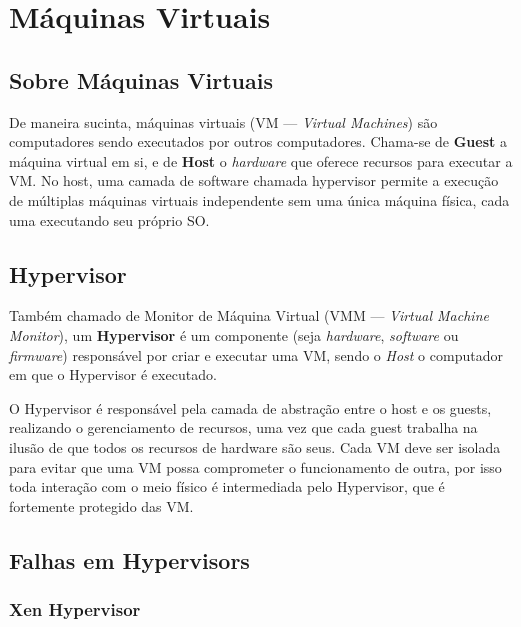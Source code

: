\documentclass{report}
\title{\todo{A gente descobre depois}}
\author{João Gabriel Trombeta\\
        João Paulo Taylor Ienczak Zanette\\
        Ranieri Schroeder Althoff}
\date{\today}
\begin{document}
\maketitle

\tableofcontents

\chapter{Máquinas Virtuais}

\section{Sobre Máquinas Virtuais}

De maneira sucinta, máquinas virtuais (VM --- \textit{Virtual Machines}) são
computadores sendo executados por outros computadores. Chama-se de
\textbf{Guest} a máquina virtual em si, e de \textbf{Host} o \textit{hardware}
que oferece recursos para executar a VM\@. No host, uma camada de software
chamada hypervisor permite a execução de múltiplas máquinas virtuais
independente sem uma única máquina física, cada uma executando seu próprio
SO\@.

\section{Hypervisor}

Também chamado de Monitor de Máquina Virtual (VMM --- \textit{Virtual Machine
Monitor}), um \textbf{Hypervisor} é um componente (seja \textit{hardware},
\textit{software} ou \textit{firmware}) responsável por criar e executar uma
VM, sendo o \textit{Host} o computador em que o Hypervisor é executado.

O Hypervisor é responsável pela camada de abstração entre o host e os guests,
realizando o gerenciamento de recursos, uma vez que cada guest trabalha na
ilusão de que todos os recursos de hardware são seus. Cada VM deve ser isolada
para evitar que uma VM possa comprometer o funcionamento de outra, por isso
toda interação com o meio físico é intermediada pelo Hypervisor, que é
fortemente protegido das VM\@.

\section{Falhas em Hypervisors}

\subsection{Xen Hypervisor}
\end{document}
